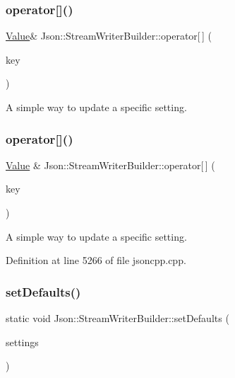 \subsubsection{\texorpdfstring{operator[]()}{operator[]()}\hspace{0.1cm}{\footnotesize\ttfamily [1/2]}}
{\footnotesize\ttfamily \hyperlink{class_json_1_1_value}{Value}\& Json\+::\+Stream\+Writer\+Builder\+::operator\mbox{[}$\,$\mbox{]} (\begin{DoxyParamCaption}\item[{\hyperlink{config_8h_a1e723f95759de062585bc4a8fd3fa4be}{J\+S\+O\+N\+C\+P\+P\+\_\+\+S\+T\+R\+I\+NG}}]{key }\end{DoxyParamCaption})}

A simple way to update a specific setting. \hypertarget{class_json_1_1_stream_writer_builder_af68f6b59cb20b074052ed12bb3d336a3}{}\label{class_json_1_1_stream_writer_builder_af68f6b59cb20b074052ed12bb3d336a3} 
\subsubsection{\texorpdfstring{operator[]()}{operator[]()}\hspace{0.1cm}{\footnotesize\ttfamily [2/2]}}
{\footnotesize\ttfamily \hyperlink{class_json_1_1_value}{Value} \& Json\+::\+Stream\+Writer\+Builder\+::operator\mbox{[}$\,$\mbox{]} (\begin{DoxyParamCaption}\item[{\hyperlink{config_8h_a1e723f95759de062585bc4a8fd3fa4be}{J\+S\+O\+N\+C\+P\+P\+\_\+\+S\+T\+R\+I\+NG}}]{key }\end{DoxyParamCaption})}

A simple way to update a specific setting. 

Definition at line 5266 of file jsoncpp.\+cpp.

\hypertarget{class_json_1_1_stream_writer_builder_a886224c308545b54ed242b436cdc90d3}{}\label{class_json_1_1_stream_writer_builder_a886224c308545b54ed242b436cdc90d3} 
\subsubsection{\texorpdfstring{set\+Defaults()}{setDefaults()}\hspace{0.1cm}{\footnotesize\ttfamily [1/2]}}
{\footnotesize\ttfamily static void Json\+::\+Stream\+Writer\+Builder\+::set\+Defaults (\begin{DoxyParamCaption}\item[{\hyperlink{class_json_1_1_value}{Json\+::\+Value} $\ast$}]{settings }\end{DoxyParamCaption})\hspace{0.3cm}{\ttfamily [static]}}

